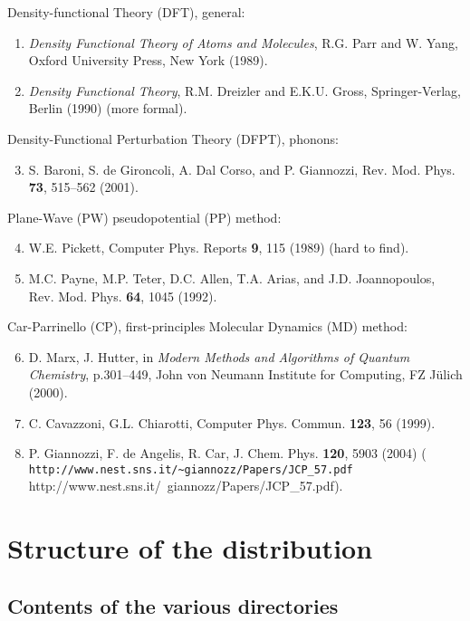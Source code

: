 \documentclass[12pt,a4paper]{article}
\begin{document}
\noindent
Density-functional Theory (DFT), general:
\begin{enumerate}
  \item
    \emph{Density Functional Theory of Atoms and Molecules}, 
    R.G. Parr and W. Yang,
    Oxford University Press, New York (1989).
  \item
    \emph{Density Functional Theory},
    R.M. Dreizler and E.K.U. Gross,
    Springer-Verlag, Berlin (1990) (more formal).
\end{enumerate}
Density-Functional Perturbation Theory (DFPT), phonons:
\begin{enumerate}
  \setcounter{enumi}{2}
  \item
    S. Baroni, S. de Gironcoli, A. Dal Corso, and P. Giannozzi,
    Rev. Mod. Phys. \textbf{73}, 515--562 (2001).
\end{enumerate}
Plane-Wave (PW) pseudopotential (PP) method:
\begin{enumerate}
  \setcounter{enumi}{3}
  \item
    W.E. Pickett,
    Computer Phys. Reports \textbf{9}, 115 (1989)
    (hard to find).
  \item
    M.C. Payne, M.P. Teter, D.C. Allen, T.A. Arias, and
    J.D. Joannopoulos,
    Rev. Mod. Phys. \textbf{64}, 1045 (1992).
\end{enumerate}
Car-Parrinello (CP), first-principles Molecular Dynamics (MD) method:
\begin{enumerate}
  \setcounter{enumi}{5}
  \item
    D. Marx, J. Hutter,
    in \emph{Modern Methods and Algorithms of Quantum Chemistry},
    p.301--449,
    John von Neumann Institute for Computing, FZ J\"ulich (2000).
  \item
    C. Cavazzoni, G.L. Chiarotti,
    Computer Phys. Commun. \textbf{123}, 56 (1999).
  \item
    P. Giannozzi, F. de Angelis, R. Car,
    J. Chem. Phys. \textbf{120}, 5903 (2004)
    (\htmladdnormallink%
     {\texttt{http://www.nest.sns.it/\~{}giannozz/Papers/JCP\_57.pdf}}%
     {http://www.nest.sns.it/~giannozz/Papers/JCP_57.pdf}).
\end{enumerate}

\section{Structure of the distribution}

\subsection{Contents of the various directories}
\end{document}
